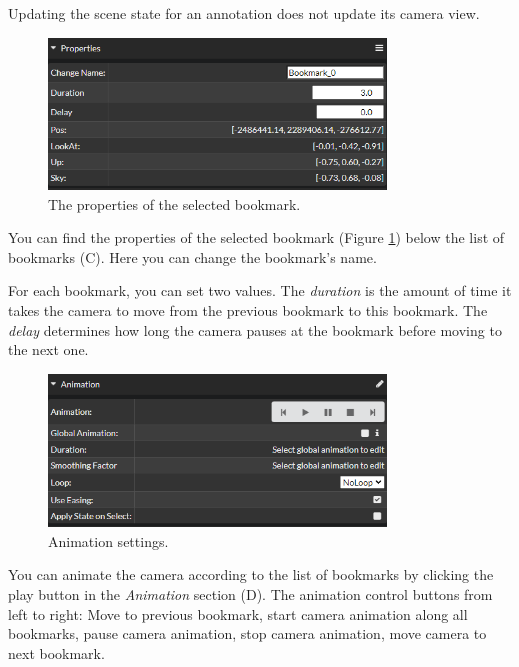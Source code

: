 Updating the scene state for an annotation does not update its camera view.

\begin{figure}[h]
	\centering
	\includegraphics[width=0.8\textwidth]{pics/SequencedBookmarks_properties.png}
	\caption[Viewer Features Bookmarks]{The properties of the selected bookmark.}
	\label{fig:seqBookmarks_properties}
\end{figure}

You can find the properties of the selected bookmark (Figure \ref{fig:seqBookmarks_properties}) below the list of bookmarks (C). Here you can change the bookmark's name.

For each bookmark, you can set two values. The \emph{duration} is the amount of time it takes the camera to move from the previous bookmark to this bookmark. The \emph{delay} determines how long the camera pauses at the bookmark before moving to the next one.

\begin{figure}[h]
	\centering
	\includegraphics[width=0.8\textwidth]{pics/SequencedBookmarks_animation.png}
	\caption[Viewer Animation]{Animation settings.}
	\label{fig:SequencedBookmarks_animation}
\end{figure}

You can animate the camera according to the list of bookmarks by clicking the play button in the \emph{Animation} section (D). The animation control buttons from left to right: Move to previous bookmark, start camera animation along all bookmarks, pause camera animation, stop camera animation, move camera to next bookmark.


